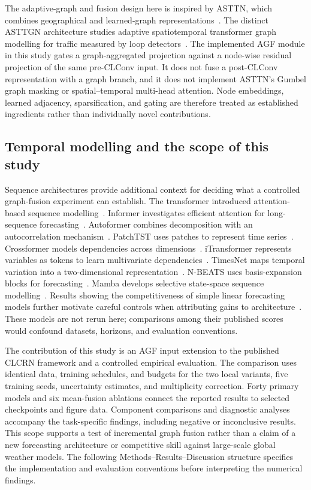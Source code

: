 \documentclass[fleqn,10pt]{wlscirep}
\begin{document}
The adaptive-graph and fusion design here is inspired by ASTTN, which combines geographical and learned-graph representations~\cite{feng2022adaptive}.
The distinct ASTTGN architecture studies adaptive spatiotemporal transformer graph modelling for traffic measured by loop detectors~\cite{huang2023adaptive}.
The implemented AGF module in this study gates a graph-aggregated projection against a node-wise residual projection of the same pre-CLConv input.
It does not fuse a post-CLConv representation with a graph branch, and it does not implement ASTTN's Gumbel graph masking or spatial--temporal multi-head attention.
Node embeddings, learned adjacency, sparsification, and gating are therefore treated as established ingredients rather than individually novel contributions.

\subsection{Temporal modelling and the scope of this study}
Sequence architectures provide additional context for deciding what a controlled graph-fusion experiment can establish.
The transformer introduced attention-based sequence modelling~\cite{vaswani2017attention}.
Informer investigates efficient attention for long-sequence forecasting~\cite{zhou2021informer}.
Autoformer combines decomposition with an autocorrelation mechanism~\cite{wu2021autoformer}.
PatchTST uses patches to represent time series~\cite{nie2023time}.
Crossformer models dependencies across dimensions~\cite{zhang2023crossformer}.
iTransformer represents variables as tokens to learn multivariate dependencies~\cite{liu2024itransformer}.
TimesNet maps temporal variation into a two-dimensional representation~\cite{wu2023timesnet}.
N-BEATS uses basis-expansion blocks for forecasting~\cite{oreshkin2020nbeats}.
Mamba develops selective state-space sequence modelling~\cite{gu2023mamba}.
Results showing the competitiveness of simple linear forecasting models further motivate careful controls when attributing gains to architecture~\cite{zeng2023transformers}.
These models are not rerun here; comparisons among their published scores would confound datasets, horizons, and evaluation conventions.

The contribution of this study is an AGF input extension to the published CLCRN framework and a controlled empirical evaluation.
The comparison uses identical data, training schedules, and budgets for the two local variants, five training seeds, uncertainty estimates, and multiplicity correction.
Forty primary models and six mean-fusion ablations connect the reported results to selected checkpoints and figure data.
Component comparisons and diagnostic analyses accompany the task-specific findings, including negative or inconclusive results.
This scope supports a test of incremental graph fusion rather than a claim of a new forecasting architecture or competitive skill against large-scale global weather models.
The following Methods--Results--Discussion structure specifies the implementation and evaluation conventions before interpreting the numerical findings.
\end{document}
